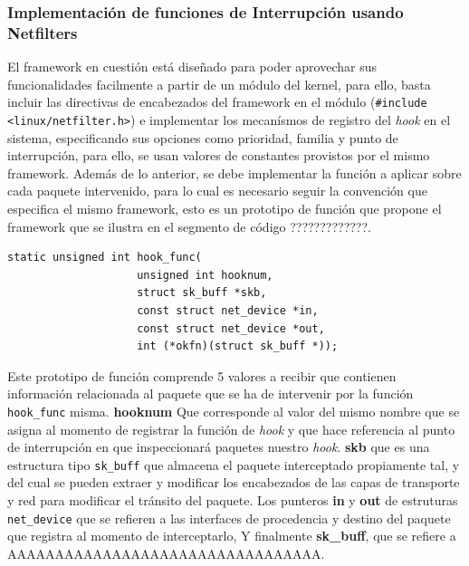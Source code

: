 \subsubsection{Implementación de funciones de Interrupción usando Netfilters}

El framework en cuestión está diseñado para poder aprovechar sus funcionalidades facilmente a partir de un módulo del kernel, para ello, basta incluir las directivas de encabezados del framework en el módulo (\verb=#include <linux/netfilter.h>=) e implementar los mecanísmos de registro del \emph{hook} en el sistema, especificando sus opciones como prioridad, familia y punto de interrupción, para ello, se usan valores de constantes provistos por el mismo framework. Además de lo anterior, se debe implementar la función a aplicar sobre cada paquete intervenido, para lo cual es necesario seguir la convención que especifica el mismo framework, esto es un prototipo de función que propone el framework que se ilustra en el segmento de código ?????????????.

\begin{lstlisting}[caption=ESO]
static unsigned int hook_func(
            		unsigned int hooknum,
            		struct sk_buff *skb, 
            		const struct net_device *in, 
            		const struct net_device *out, 
            		int (*okfn)(struct sk_buff *));
\end{lstlisting}

Este prototipo de función comprende 5 valores a recibir que contienen información relacionada al paquete que se ha de intervenir por la función \verb=hook_func= misma. \textbf{hooknum} Que corresponde al valor del mismo nombre que se asigna al momento de registrar la función de \emph{hook} y que hace referencia al punto de interrupción en que inspeccionará paquetes nuestro \emph{hook}. \textbf{skb} que es una estructura tipo \verb=sk_buff= que almacena el paquete interceptado propiamente tal, y del cual se pueden extraer y modificar los encabezados de las capas de transporte y red para modificar el tránsito del paquete. Los punteros \textbf{in} y \textbf{out} de estruturas \verb=net_device= que se refieren a las interfaces de procedencia y destino del paquete que registra al momento de interceptarlo, Y finalmente \textbf{sk\_buff}, que se refiere a AAAAAAAAAAAAAAAAAAAAAAAAAAAAAAAAA.


